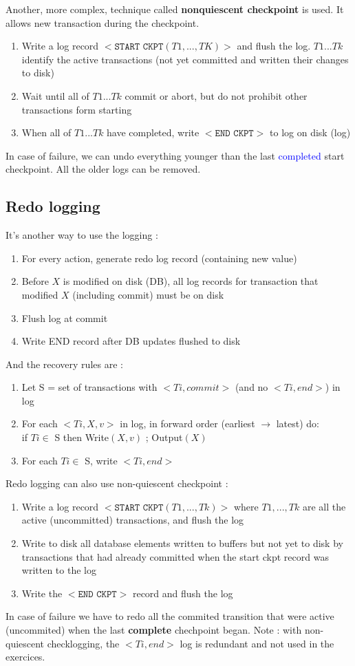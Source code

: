 \documentclass[12pt,a4paper]{article}
\begin{document}
Another, more complex, technique called \textbf{nonquiescent checkpoint} is used. It allows new transaction during the checkpoint.
\begin{enumerate}
\item Write a log record $<\texttt{START CKPT} (T1,..., TK)>$ and flush the log. $T1...Tk$ identify the active transactions (not yet committed and written their changes to disk)
\item Wait until all of $T1 ... Tk$ commit or abort, but do not prohibit other transactions form starting
\item When all of $T1 ... Tk$ have completed,
write $<\texttt{END CKPT}>$ to log on disk (log)
\end{enumerate}
In case of failure, we can undo everything younger than the last \textcolor{blue}{completed} start checkpoint. All the older logs can be removed.

\subsection{Redo logging}
It's another way to use the logging :
\begin{enumerate}
\item For every action, generate redo log record (containing new value)
\item Before $X$ is modified on disk (DB), all log records for transaction that modified $X$ (including commit) must be on disk
\item Flush log at commit
\item Write END record after DB updates flushed to disk
\end{enumerate}
And the recovery rules are :
\begin{enumerate}
\item Let S = set of transactions with $<Ti, commit>$ (and no $<Ti, end>$) in log
\item For each $<Ti,X,v>$ in log, in forward order (earliest $\rightarrow$ latest) do:\\
if $Ti \in$ S then {Write$(X,v)$ ; Output$(X)$}
\item For each $Ti \in$ S, write $<Ti, end>$
\end{enumerate}

Redo logging can also use non-quiescent checkpoint :
\begin{enumerate}
\item  Write a log record $<\texttt{START CKPT} (T1,...,Tk)>$ where $T1,...,Tk$ are all the active (uncommitted) transactions, and flush the log
\item Write to disk all database elements written to buffers but not yet to disk by transactions that had already committed when the start ckpt record was written to the log
\item Write the $<\texttt{END CKPT}>$ record and flush the
log
\end{enumerate}
In case of failure we have to redo all the commited transition that were active (uncommited) when the last \textbf{complete} chechpoint began.
Note : with non-quiescent checklogging, the $<Ti,end>$ log is redundant and not used in the exercices.\\
\\
\end{document}
